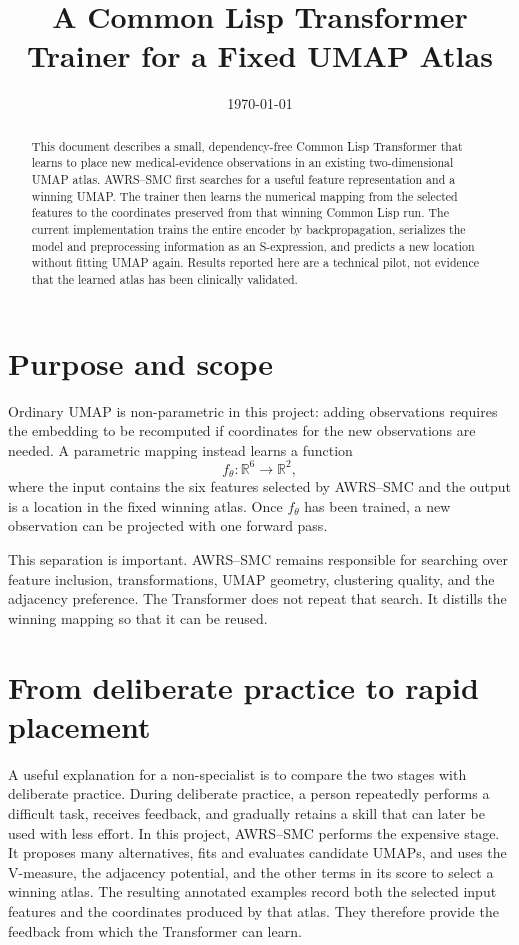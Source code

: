 \documentclass[12pt]{article}
\title{A Common Lisp Transformer Trainer for a Fixed UMAP Atlas}
\author{}
\date{\today}
\begin{document}
\maketitle

\begin{abstract}
This document describes a small, dependency-free Common Lisp Transformer that
learns to place new medical-evidence observations in an existing two-dimensional
UMAP atlas.  AWRS--SMC first searches for a useful feature representation and a
winning UMAP.  The trainer then learns the numerical mapping from the selected
features to the coordinates preserved from that winning Common Lisp run.  The
current implementation trains the entire encoder by backpropagation, serializes
the model and preprocessing information as an S-expression, and predicts a new
location without fitting UMAP again.  Results reported here are a technical pilot,
not evidence that the learned atlas has been clinically validated.
\end{abstract}

\section{Purpose and scope}

Ordinary UMAP is non-parametric in this project: adding observations requires the
embedding to be recomputed if coordinates for the new observations are needed.  A
parametric mapping instead learns a function
\[
  f_{\theta}:\mathbb{R}^{6}\longrightarrow\mathbb{R}^{2},
\]
where the input contains the six features selected by AWRS--SMC and the output is
a location in the fixed winning atlas.  Once $f_{\theta}$ has been trained, a new
observation can be projected with one forward pass.

This separation is important.  AWRS--SMC remains responsible for searching over
feature inclusion, transformations, UMAP geometry, clustering quality, and the
adjacency preference.  The Transformer does not repeat that search.  It distills
the winning mapping so that it can be reused.

\section{From deliberate practice to rapid placement}

A useful explanation for a non-specialist is to compare the two stages with
deliberate practice.  During deliberate practice, a person repeatedly performs a
difficult task, receives feedback, and gradually retains a skill that can later be
used with less effort.  In this project, AWRS--SMC performs the expensive stage.
It proposes many alternatives, fits and evaluates candidate UMAPs, and uses the
V-measure, the adjacency potential, and the other terms in its score to select a
winning atlas.  The resulting annotated examples record both the selected input
features and the coordinates produced by that atlas.  They therefore provide the
feedback from which the Transformer can learn.
\end{document}
